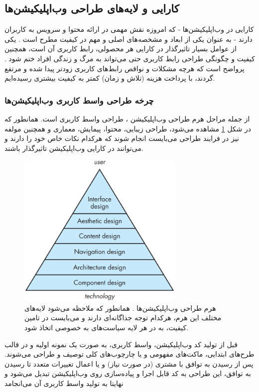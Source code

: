 \documentclass{article}
\theoremstyle{definition}
\begin{document}
\subsection{کارایی و لایه‌های طراحی وب‌اپلیکیشن‌ها}
کارایی در وب‌اپلیکیشن‌ها - که امروزه نقش مهمی در ارائه محتوا و سرویس به کاربران دارند - به عنوان یکی از ابعاد و مشخصه‌های اصلی و مهم در کیفیت مطرح است
\cite{pressman}.
یکی از عوامل بسیار تاثیرگذار در کارایی هر محصولی، رابط کاربری آن است، همچنین کیفیت و چگونگی طراحی رابط کاربری حتی می‌تواند به مرگ و زندگی افراد ختم شود
\cite{measuring}.
پرواضح است که هرچه مشکلات و نواقص رابط‌های کاربری زودتر پیدا شده و مرتفع گردند، با پرداخت هزینه (تلاش و زمان) کمتر به کیفیت بیشتری رسیده‌ایم.
\subsubsection{چرخه طراحی واسط کاربری وب‌اپلیکیشن‌ها}
از جمله مراحل هرم طراحی وب‌اپلیکیشن
\cite{pressman}
، طراحی واسط کاربری است.  همانطور که در شکل
\ref{pyramid}
مشاهده می‌شود، طراحی زیبایی، محتوا، پیمایش، معماری و همچنین مولفه نیز در فرایند طراحی می‌بایست انجام شوند که هرکدام نکات خاص خود را دارند و می‌توانند در کارایی وب‌اپلیکیشن تاثیرگذار باشند.
\begin{figure}[H]
	\centering\includegraphics[width=8cm]{Resources/pyramid.PNG}
	\caption{هرم طراحی وب‌اپلیکیشن‌ها
	\cite{pressman}.
	همانطور که ملاحظه می‌شود لایه‌های مختلف این هرم، هرکدام توجه جداگانه‌ای دارند و می‌بایست در تامین کیفیت، به در هر لایه سیاست‌های به خصوصی اتخاذ شود.
}
	\label{pyramid}
\end{figure}
قبل از تولید کد وب‌اپلیکیشن، واسط کاربری، به صورت یک نمونه اولیه و در قالب طرح‌های ابتدایی، ماکت‌های مفهومی و یا چارچوب‌های کلی توصیف و طراحی می‌شوند. پس از رسیدن به توافق با مشتری (در صورت نیاز) و یا اعمال تغییرات متعدد تا رسیدن به توافق، این طراحی به کد قابل اجرا و پیاده‌سازی روی وب‌اپلیکیشن تبدیل می‌شود و نهایتا به تولید واسط کاربری آن می‌انجامد
\end{document}
